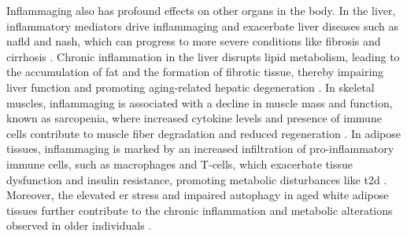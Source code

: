 \par Inflammaging also has profound effects on other organs in the body. In the liver, inflammatory mediators drive inflammaging and exacerbate liver diseases such as \gls{nafld} and \gls{nash}, which can progress to more severe conditions like fibrosis and cirrhosis \textbf{\cite{jorquera_inflammaging_2022,li_inflammation_2023}}. Chronic inflammation in the liver disrupts lipid metabolism, leading to the accumulation of fat and the formation of fibrotic tissue, thereby impairing liver function and promoting aging-related hepatic degeneration \textbf{\cite{chung_advances_2021}}. In skeletal muscles, inflammaging is associated with a decline in muscle mass and function, known as sarcopenia, where increased cytokine levels and presence of immune cells contribute to muscle fiber degradation and reduced regeneration \textbf{\cite{jorquera_inflammaging_2022,antuna_inflammaging_2022,jimenez-gutierrez_molecular_2022}}. In adipose tissues, inflammaging is marked by an increased infiltration of pro-inflammatory immune cells, such as macrophages and T-cells, which exacerbate tissue dysfunction and insulin resistance, promoting metabolic disturbances like \gls{t2d} \textbf{\cite{zamboni_how_2021}}. Moreover, the elevated \gls{er} stress and impaired autophagy in aged white adipose tissues further contribute to the chronic inflammation and metabolic alterations observed in older individuals \textbf{\cite{ghosh_impaired_2016}}. 





